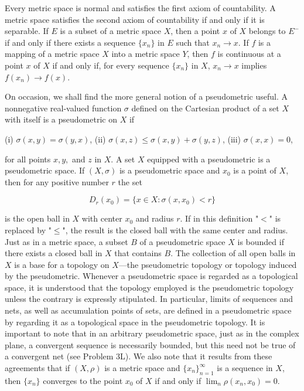 Every metric space is normal and satisfies the first axiom of countability. A metric space satisfies the second axiom of countability if and only if it is separable. If $E$ is a subset of a metric space $X$, then a point $x$ of $X$ belongs to $E^{-}$ if and only if there exists a sequence $\{x_n\}$ in $E$ such that $x_n \rightarrow x$. If $f$ is a mapping of a metric space $X$ into a metric space $Y$, then $f$ is continuous at a point $x$ of $X$ if and only if, for every sequence $\{x_n\}$ in $X$, $x_n \rightarrow x$ implies $f(x_n) \rightarrow f(x)$.

On occasion, we shall find the more general notion of a pseudometric useful. A nonnegative real-valued function $\sigma$ defined on the Cartesian product of a set $X$ with itself is a pseudometric on $X$ if

(i) $\sigma(x, y) = \sigma(y, x)$,
(ii) $\sigma(x, z) \leq \sigma(x, y) + \sigma(y, z)$,
(iii) $\sigma(x, x) = 0$,

for all points $x, y,$ and $z$ in $X$. A set $X$ equipped with a pseudometric is a pseudometric space. If $(X, \sigma)$ is a pseudometric space and $x_0$ is a point of $X$, then for any positive number $r$ the set

$$D_r(x_0) = \{x \in X : \sigma(x, x_0) < r\}$$

is the open ball in $X$ with center $x_0$ and radius $r$. If in this definition "$<$" is replaced by "$\leq$", the result is the closed ball with the same center and radius. Just as in a metric space, a subset $B$ of a pseudometric space $X$ is bounded if there exists a closed ball in $X$ that contains $B$. The collection of all open balls in $X$ is a base for a topology on $X$—the pseudometric topology or topology induced by the pseudometric. Whenever a pseudometric space is regarded as a topological space, it is understood that the topology employed is the pseudometric topology unless the contrary is expressly stipulated. In particular, limits of sequences and nets, as well as accumulation points of sets, are defined in a pseudometric space by regarding it as a topological space in the pseudometric topology. It is important to note that in an arbitrary pseudometric space, just as in the complex plane, a convergent sequence is necessarily bounded, but this need not be true of a convergent net (see Problem 3L). We also note that it results from these agreements that if $(X, \rho)$ is a metric space and $\{x_n\}_{n=1}^{\infty}$ is a sequence in $X$, then $\{x_n\}$ converges to the point $x_0$ of $X$ if and only if $\lim_n \rho(x_n, x_0) = 0$.

